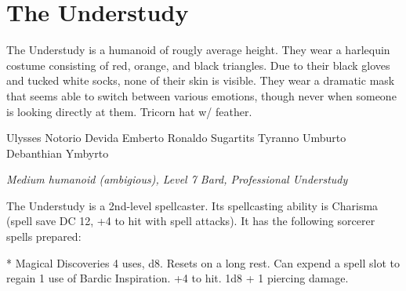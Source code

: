 \onecolumn
\section {The Understudy}

The Understudy is a humanoid of rougly average height. They wear a harlequin costume consisting of red, orange, and black triangles. Due to their black gloves and tucked white socks, none of their skin is visible. They wear a dramatic mask that seems able to switch between various emotions, though never when someone is looking directly at them. Tricorn hat w/ feather.

\begin{monsterbox}{Ulysses Notorio Devida Emberto Ronaldo Sugartits Tyranno Umburto Debanthian Ymbyrto}
\begin{hangingpar}
\textit{Medium humanoid (ambigious), Level 7 Bard, Professional Understudy}
\end{hangingpar}
\dndline%
\basics[%
armorclass = 12,
hitpoints = 35,
speed = {30 ft.}
]
\dndline%
\stats[%
STR = \stat{12},
DEX = \stat{13},
CON = \stat{13},
INT = \stat{12},
WIS = \stat{13},
CHA = \stat{18}
]
\dndline%
\details[%
skills={Performance +10, Persuasion +10, Deception +7, Acrobatics +4, History +4, Religion +4, All others +2},
damageimmunities={},
savingthrows={Dexterity +4, Charisma +7},
conditionimmunities={},
damageresistances={},
damagevulnerabilities={},
senses={passive Perception 12},
languages={Whatever the role requires},
challenge=3,
]
\dndline%

  The Understudy is a 2nd-level spellcaster. Its spellcasting ability is Charisma (spell save DC 12, +4 to hit with spell attacks). It has the following sorcerer spells prepared:
  \begin{DndMonsterSpells}
    \DndMonsterSpellLevel[4][1]{}
  \end{DndMonsterSpells}
  * Magical Discoveries
 4 uses, d8. Resets on a long rest. Can expend a spell slot to regain 1 use of Bardic Inspiration.
 +4 to hit. 1d8 + 1 piercing damage.


\end{monsterbox}
